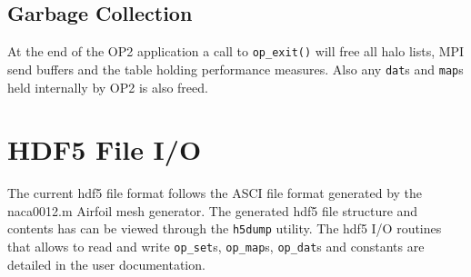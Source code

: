\documentclass[11pt]{article}
\begin{document}

\subsection{Garbage Collection}\label{subsec/cleanup}
At the end of the OP2 application a call to \texttt{op\_exit()} will free all halo lists, MPI send buffers and the table
holding performance measures. Also any \texttt{dat}s and \texttt{map}s held internally by OP2 is also freed.

\section{HDF5 File I/O}\label{sec/hdf5}
The current hdf5 file format follows the ASCI file format generated by the naca0012.m Airfoil mesh generator. The
generated hdf5 file structure and contents has can be viewed through the \texttt{h5dump} utility.  The hdf5 I/O routines
that allows to read and write \texttt{op\_set}s, \texttt{op\_map}s, \texttt{op\_dat}s and constants are detailed in the
user documentation.




\end{document}
